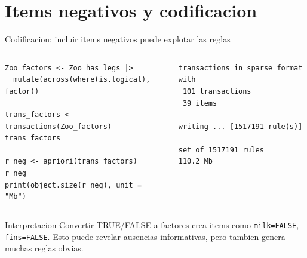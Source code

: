 \documentclass[10pt,aspectratio=169]{beamer}
\begin{document}
\section{Items negativos y codificacion}
\begin{frame}[fragile]{Codificacion: incluir items negativos puede explotar las reglas}
\begin{columns}[T]
\begin{lstlisting}[style=rcode]
Zoo_factors <- Zoo_has_legs |>
  mutate(across(where(is.logical), factor))

trans_factors <- transactions(Zoo_factors)
trans_factors

r_neg <- apriori(trans_factors)
r_neg
print(object.size(r_neg), unit = "Mb")
\end{lstlisting}

\begin{lstlisting}[style=out]
transactions in sparse format with
 101 transactions
 39 items

writing ... [1517191 rule(s)]

set of 1517191 rules
110.2 Mb
\end{lstlisting}
\end{columns}

\begin{alertblock}{Interpretacion}
Convertir TRUE/FALSE a factores crea items como \texttt{milk=FALSE}, \texttt{fins=FALSE}. Esto puede revelar ausencias informativas, pero tambien genera muchas reglas obvias.
\end{alertblock}
\end{frame}
\end{document}
